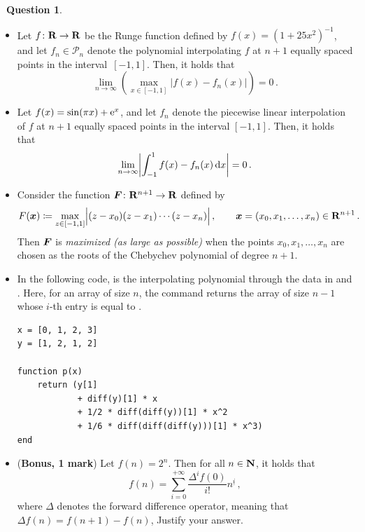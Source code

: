 \documentclass[10pt]{article}
\theoremstyle{definition}
\newtheorem{question}{{\normalfont \faGears}~Question}
\begin{document}
\begin{question}
\begin{enumerate}
\begin{itemize}
            \item 
                Let $f \colon \mathbf R \to \mathbf R$ be the Runge function defined by $f(x) = (1 + 25 x^2)^{-1}$,
                and let $f_n \in \mathcal P_{n}$ denote the polynomial interpolating $f$ at $n + 1$ equally spaced points in the interval~$[-1, 1]$.
                Then, it holds that
                \[
                    \lim_{n \to \infty} \left( \max_{x \in [-1, 1]} \bigl\lvert f(x) - f_n(x) \bigr\rvert \right) = 0 \, .
                \]

            \item 
                Let $f(x) = \sin(\pi x) + \mathrm e^x$,
                and let $f_n$ denote the piecewise linear interpolation of $f$ at $n + 1$ equally spaced points in the interval $[-1, 1]$.
                Then, it holds that
                \[
                    \lim_{n \to \infty} \biggl\lvert \int_{-1}^{1}  f(x) - f_n(x) \, \mathrm d x \biggr\rvert = 0 \, .
                \]


            \item
                Consider the function $\mathbf{\boldsymbol{F}} \colon \mathbf R^{n+1} \to \mathbf R$ defined by
                \[
                    F(\mathbf{\boldsymbol{x}}) \coloneq \max_{z \in [-1, 1]} \Bigl\lvert (z - x_0)(z - x_1) \dotsb (z - x_n) \Bigr\rvert \, , 
                    \qquad \mathbf{\boldsymbol{x}} = (x_0, x_1, \dotsc, x_n) \in \mathbf R^{n+1} \, .
                \]
                Then $\mathbf{\boldsymbol{F}}$ is \emph{maximized (as large as possible)} when the points $x_0, x_1, \dotsc, x_n$ are chosen as the roots of the Chebychev polynomial of degree $n + 1$.

            \item
                In the following code,
                 is the interpolating polynomial through the data in  and .
                Here, for an array  of size $n$, the command  returns the array of size $n-1$
                whose $i$-th entry is equal to .
        \begin{verbatim}
x = [0, 1, 2, 3]
y = [1, 2, 1, 2]

function p(x)
    return (y[1]
            + diff(y)[1] * x
            + 1/2 * diff(diff(y))[1] * x^2
            + 1/6 * diff(diff(diff(y)))[1] * x^3)
end
        \end{verbatim}
            \item {(\textbf{Bonus, 1 mark})}
                Let $f(n) = 2^n$. Then for all $n \in \mathbf N$, it holds that
                \[
                    f(n) = \sum_{i=0}^{+\infty} \frac{\Delta^i f(0)}{i!} n^{\underline{i}} \, ,
                \]
                where $\Delta$ denotes the forward difference operator,
                meaning that $\Delta f(n) = f(n+1) - f(n)$,
                Justify your answer.
        \end{itemize}
\end{enumerate}
\end{question}
\end{document}
